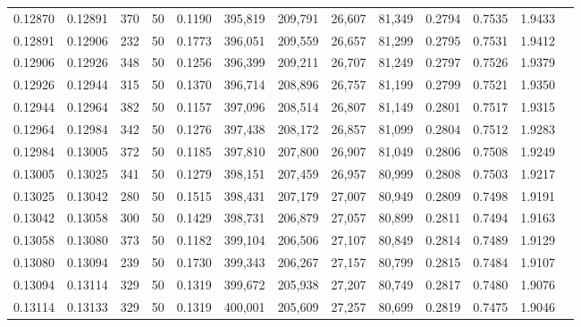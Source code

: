 \begin{tabular}{rrrrrrrrrrrrr}
0.12870 & 0.12891 &   370 &  50 &                                     0.1190 & 395,819 & 209,791 &  26,607 &  81,349 & 0.2794 & 0.7535 & 1.9433 \\
0.12891 & 0.12906 &   232 &  50 &                                     0.1773 & 396,051 & 209,559 &  26,657 &  81,299 & 0.2795 & 0.7531 & 1.9412 \\
0.12906 & 0.12926 &   348 &  50 &                                     0.1256 & 396,399 & 209,211 &  26,707 &  81,249 & 0.2797 & 0.7526 & 1.9379 \\
0.12926 & 0.12944 &   315 &  50 &                                     0.1370 & 396,714 & 208,896 &  26,757 &  81,199 & 0.2799 & 0.7521 & 1.9350 \\
0.12944 & 0.12964 &   382 &  50 &                                     0.1157 & 397,096 & 208,514 &  26,807 &  81,149 & 0.2801 & 0.7517 & 1.9315 \\
0.12964 & 0.12984 &   342 &  50 &                                     0.1276 & 397,438 & 208,172 &  26,857 &  81,099 & 0.2804 & 0.7512 & 1.9283 \\
0.12984 & 0.13005 &   372 &  50 &                                     0.1185 & 397,810 & 207,800 &  26,907 &  81,049 & 0.2806 & 0.7508 & 1.9249 \\
0.13005 & 0.13025 &   341 &  50 &                                     0.1279 & 398,151 & 207,459 &  26,957 &  80,999 & 0.2808 & 0.7503 & 1.9217 \\
0.13025 & 0.13042 &   280 &  50 &                                     0.1515 & 398,431 & 207,179 &  27,007 &  80,949 & 0.2809 & 0.7498 & 1.9191 \\
0.13042 & 0.13058 &   300 &  50 &                                     0.1429 & 398,731 & 206,879 &  27,057 &  80,899 & 0.2811 & 0.7494 & 1.9163 \\
0.13058 & 0.13080 &   373 &  50 &                                     0.1182 & 399,104 & 206,506 &  27,107 &  80,849 & 0.2814 & 0.7489 & 1.9129 \\
0.13080 & 0.13094 &   239 &  50 &                                     0.1730 & 399,343 & 206,267 &  27,157 &  80,799 & 0.2815 & 0.7484 & 1.9107 \\
0.13094 & 0.13114 &   329 &  50 &                                     0.1319 & 399,672 & 205,938 &  27,207 &  80,749 & 0.2817 & 0.7480 & 1.9076 \\
0.13114 & 0.13133 &   329 &  50 &                                     0.1319 & 400,001 & 205,609 &  27,257 &  80,699 & 0.2819 & 0.7475 & 1.9046 \\

\end{tabular}
